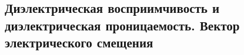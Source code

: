 \subsection{Диэлектрическая восприимчивость и диэлектрическая проницаемость. Вектор электрического смещения}